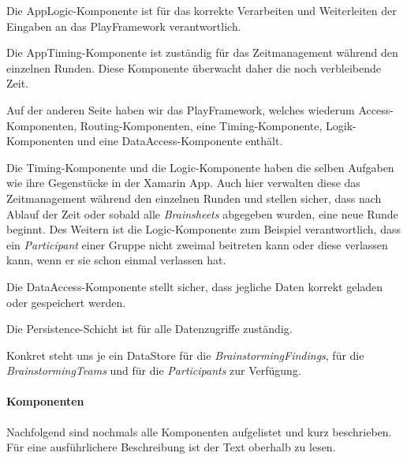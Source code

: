 Die AppLogic-Komponente ist für das korrekte Verarbeiten und Weiterleiten der Eingaben an das PlayFramework verantwortlich.

Die AppTiming-Komponente ist zuständig für das Zeitmanagement während den einzelnen Runden. Diese Komponente überwacht daher die noch verbleibende Zeit.

Auf der anderen Seite haben wir das PlayFramework, welches wiederum Access-Komponenten, Routing-Komponenten, eine Timing-Komponente, Logik-Komponenten und eine DataAccess-Komponente enthält.

Die Timing-Komponente und die Logic-Komponente haben die selben Aufgaben wie ihre Gegenstücke in der Xamarin App. Auch hier verwalten diese das Zeitmanagement während den einzelnen Runden und stellen sicher, dass nach Ablauf der Zeit oder sobald alle \textit{Brainsheets} abgegeben wurden, eine neue Runde beginnt. Des Weitern ist die Logic-Komponente zum Beispiel verantwortlich, dass ein \textit{Participant} einer Gruppe nicht zweimal beitreten kann oder diese verlassen kann, wenn er sie schon einmal verlassen hat. 

Die DataAccess-Komponente stellt sicher, dass jegliche Daten korrekt geladen oder gespeichert werden.

Die Persistence-Schicht ist für alle Datenzugriffe zuständig. 

Konkret steht uns je ein DataStore für die \textit{BrainstormingFindings}, für die \textit{BrainstormingTeams} und für die \textit{Participants} zur Verfügung.

\paragraph*{Komponenten}
Nachfolgend sind nochmals alle Komponenten aufgelistet und kurz beschrieben. Für eine ausführlichere Beschreibung ist der Text oberhalb zu lesen.


